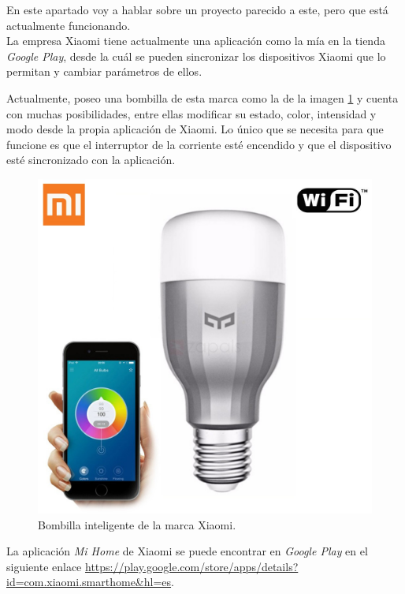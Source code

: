 
En este apartado voy a hablar sobre un proyecto parecido a este, pero que está actualmente funcionando. \\
La empresa Xiaomi tiene actualmente una aplicación como la mía en la tienda \textit{Google Play}, desde la cuál se pueden sincronizar los dispositivos Xiaomi que lo permitan y cambiar parámetros de ellos.

Actualmente, poseo una bombilla de esta marca como la de la imagen \ref{fig:yeelight} y cuenta con muchas posibilidades, entre ellas modificar su estado, color, intensidad y modo desde la propia aplicación de Xiaomi. Lo único que se necesita para que funcione es que el interruptor de la corriente esté encendido y que el dispositivo esté sincronizado con la aplicación.\\

\begin{figure}[h!]
	\centering
	\includegraphics[width=0.35\linewidth]{img/xiaomiYeelight}
	\caption{Bombilla inteligente de la marca Xiaomi.}
	\label{fig:yeelight}
\end{figure}

La aplicación \textit{Mi Home} de Xiaomi se puede encontrar en \textit{Google Play} en el siguiente enlace \url{https://play.google.com/store/apps/details?id=com.xiaomi.smarthome&hl=es}.